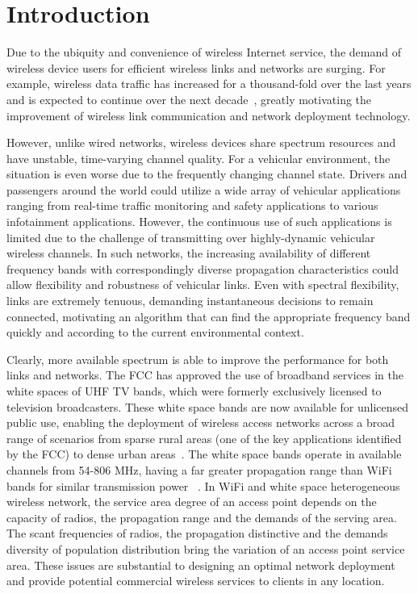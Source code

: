 \chapter{Introduction} 
\label{ch:introduction}

Due to the ubiquity and convenience of wireless Internet service, the demand of 
wireless device users for efficient wireless links and networks are surging.
For example, wireless 
data traffic has increased for a thousand-fold over the last years and is 
expected to continue over the next decade~\cite{metis}, greatly motivating 
the improvement of wireless link communication and network deployment technology.

However, unlike wired networks, wireless devices share spectrum resources 
and have unstable, time-varying channel quality. For a vehicular
environment, the situation is even worse due to the frequently changing channel 
state. Drivers and passengers around the world could utilize a 
wide array of vehicular applications ranging from real-time traffic 
monitoring and safety applications to various infotainment applications.
However, the continuous use of such applications is limited due to the
challenge of transmitting over highly-dynamic vehicular wireless channels.
In such networks, the increasing availability of different frequency bands 
with correspondingly diverse propagation characteristics could allow flexibility 
and robustness of vehicular links. Even with spectral flexibility, links are 
extremely tenuous, demanding instantaneous decisions to remain connected, 
motivating an algorithm that can find the appropriate frequency band quickly 
and according to the current environmental context.

Clearly, more available spectrum is able to improve the performance for 
both links and networks. The FCC has approved the use of broadband 
services in the white spaces of UHF TV bands, which were formerly exclusively 
licensed to television broadcasters. These white space bands are now available 
for unlicensed public use, enabling the deployment of wireless access networks 
across a broad range of scenarios from sparse rural areas (one of the key 
applications identified by the FCC) to dense urban areas~\cite{carlson}. The 
white space bands operate in available channels from 54-806 MHz, having a far 
greater propagation range than WiFi bands for similar transmission power
~\cite{balanis2012antenna}. In WiFi and white space heterogeneous wireless 
network, the service area degree of an access point depends on the capacity 
of radios, the propagation range and the demands of the serving area. The scant 
frequencies of radios, the propagation distinctive and the demands diversity 
of population distribution bring the variation of an access point service area. 
These issues are substantial to designing an optimal network deployment and 
provide potential commercial wireless services to clients in any location.

